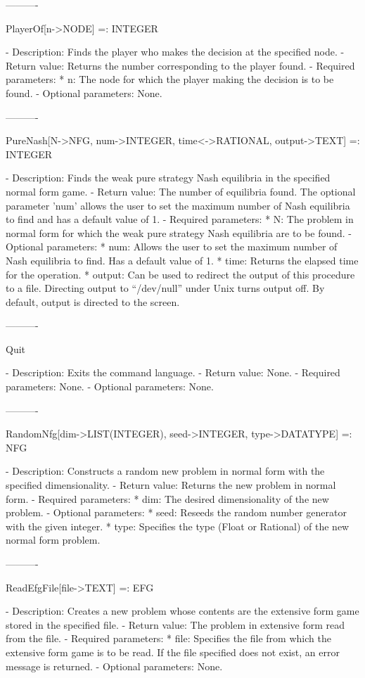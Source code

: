----------

PlayerOf[n->NODE] =: INTEGER

   -	Description:  Finds the player who makes the decision at the specified
	node.
   -	Return value:  Returns the number corresponding to the player found.
   -	Required parameters:
	  *  n:  The node for which the player making the decision is to be
		found.
   -	Optional parameters:  None.

----------

PureNash[N->NFG, {num->INTEGER}, {time<->RATIONAL}, {output->TEXT}]
	 =: INTEGER

   -	Description:  Finds the weak pure strategy Nash equilibria in the 
	specified normal form game.  
   -	Return value:  The number of equilibria found.  The optional parameter 
	'num' allows the user to set the maximum number of Nash equilibria to 
	find and has a default value of 1.
   -	Required parameters:
	  *  N:  The problem in normal form for which the weak pure strategy
		Nash equilibria are to be found.
   -	Optional parameters:
	  *  num:  Allows the user to set the maximum number of Nash equilibria
		to find.  Has a default value of 1.
	  *  time:  Returns the elapsed time for the operation.
	  *  output:  Can be used to redirect the output of this procedure to a
		file.  Directing output to ``/dev/null'' under Unix turns 
		output off.  By default, output is directed to the screen.  

----------

Quit

   -	Description:  Exits the command language.
   -	Return value:  None.
   -	Required parameters:  None.
   -	Optional parameters:  None.

----------

RandomNfg[dim->LIST(INTEGER), {seed->INTEGER}, {type->DATATYPE}] =: NFG

   -	Description:  Constructs a random new problem in normal form with the 
	specified dimensionality.
   -	Return value:  Returns the new problem in normal form.
   -	Required parameters:
	  *  dim:  The desired dimensionality of the new problem.
   -	Optional parameters:
	  *  seed:  Reseeds the random number generator with the given integer.
	  *  type:  Specifies the type (Float or Rational) of the new normal 
		form problem.

----------

ReadEfgFile[file->TEXT] =: EFG

   -	Description:  Creates a new problem whose contents are the extensive 
	form game stored in the specified file.
   -	Return value:  The problem in extensive form read from the file.
   -	Required parameters:
	  *  file:  Specifies the file from which the extensive form game is to
		be read.  If the file specified does not exist, an error 
		message is returned.
   -	Optional parameters:  None.

